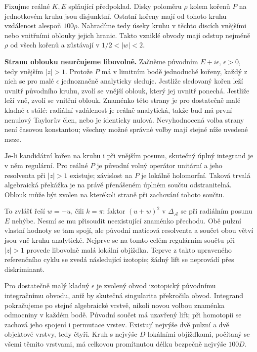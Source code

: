 \documentclass[11pt,a4paper]{article}
\theoremstyle{remark}\newtheorem{remark}[theorem]{Poznámka}
\numberwithin{equation}{section}
\begin{document}
Fixujme reálné \(K,E\) splňující předpoklad. Disky poloměru \(\rho\) kolem kořenů \(P\) na jednotkovém kruhu jsou disjunktní. Ostatní kořeny mají od tohoto kruhu vzdálenost alespoň \(100\rho\). Nahradíme tedy úseky kruhu v těchto discích vnějšími nebo vnitřními oblouky jejich hranic. Takto vzniklé obvody mají odstup nejméně \(\rho\) od všech kořenů a zůstávají v \(1/2<|w|<2\).

\textbf{Stranu oblouku neurčujeme libovolně.} Začněme původním \(E+i\epsilon\), \(\epsilon>0\), tedy vnějším \(|z|>1\). Protože \(P\) má v limitním bodě jednoduché kořeny, každý z nich se pro malé \(\epsilon\) jednoznačně analyticky sleduje. Jestliže sledovaný kořen leží uvnitř původního kruhu, zvolí se vnější oblouk, který jej uvnitř ponechá. Jestliže leží vně, zvolí se vnitřní oblouk. Znaménko této strany je pro dostatečně malé kladné \(\epsilon\) stálé: radiální vzdálenost je reálně analytická, takže buď má první nenulový Taylorův člen, nebo je identicky nulová. Nevyhodnocená volba strany není časovou konstantou; všechny možné správné volby mají stejné níže uvedené meze.

Je-li kandidátní kořen na kruhu i při vnějším posunu, skutečný úplný integrand je v něm regulární. Pro reálné \(P\) je původní volný operátor unitární a jeho resolventa při \(|z|>1\) existuje; závislost na \(P\) je lokálně holomorfní. Taková trvalá algebraická překážka je na právě přenášeném úplném součtu odstranitelná. Oblouk může být zvolen na kterékoli straně při zachování tohoto součtu.

To zvlášť řeší \(w=-u\), čili \(k=\pi\): faktor \((u+w)^2\) v \(\Delta_{\mathscr A}\) se při radiálním posunu \(E\) nehýbe. Nesmí se mu přisoudit neexistující znaménko přechodu. Obě pulzní vlastní hodnoty se tam spojí, ale původní maticová resolventa a součet obou větví jsou vně kruhu analytické. Nejprve se na tomto celém regulárním součtu při \(|z|>1\) provede libovolně malá lokální objížďka. Teprve z takto upraveného referenčního cyklu se zvedá následující izotopie; žádný lift se neprovádí přes diskriminant.

Pro dostatečně malý kladný \(\epsilon\) je zvolený obvod izotopický původnímu integračnímu obvodu, aniž by skutečná singularita překročila obvod. Integrand pokračujeme po stejné algebraické vrstvě, nikoli novou volbou znaménka odmocniny v každém bodě. Původní součet má uzavřený lift; při homotopii se zachová jeho spojení i permutace vrstev. Existují nejvýše dvě pulzní a dvě objektové vrstvy, tedy čtyři. Kruh s nejvýše \(D\) lokálními objížďkami, počítaný se všemi těmito vrstvami, má celkovou promítnutou délku bezpečně nejvýše \(100D\).
\end{document}
